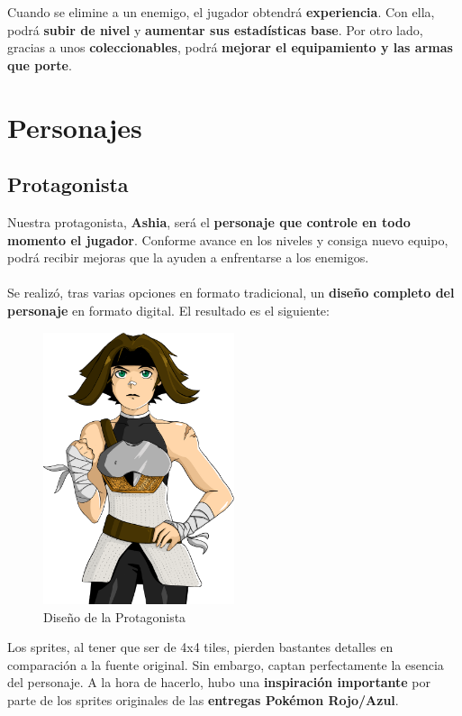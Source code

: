 Cuando se elimine a un enemigo, el jugador obtendrá \textbf{experiencia}. Con ella, podrá \textbf{subir de nivel} y \textbf{aumentar sus estadísticas base}. Por otro lado, gracias a unos \textbf{coleccionables}, podrá \textbf{mejorar el equipamiento y las armas que porte}.

\section{Personajes}

\subsection{Protagonista}

Nuestra protagonista, \textbf{Ashia}, será el \textbf{personaje que controle en todo momento el jugador}. Conforme avance en los niveles y consiga nuevo equipo, podrá recibir mejoras que la ayuden a enfrentarse a los enemigos.
\\ \\
Se realizó, tras varias opciones en formato tradicional, un \textbf{diseño completo del personaje} en formato digital. El resultado es el siguiente:

\begin{figure}[h]
\centering
\includegraphics[width=0.5\textwidth]{include/images/desarrollo/protagonist.png}
\caption{Diseño de la Protagonista}
\label{figure:protagonist}
\end{figure}

Los sprites, al tener que ser de 4x4 tiles, pierden bastantes detalles en comparación a la fuente original. Sin embargo, captan perfectamente la esencia del personaje. A la hora de hacerlo, hubo una \textbf{inspiración importante} por parte de los sprites originales de las \textbf{entregas Pokémon Rojo/Azul}.

